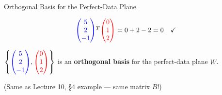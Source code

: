 \documentclass[10pt]{beamer}
\theoremstyle{definition}
\newcommand{\x}[1]{\alert{\textbf{#1}}}
\newcommand{\rd}[1]{{\color{red}#1}}                  %
\newcommand{\bl}[1]{{\color{blue}#1}}                 %
\begin{document}
\begin{frame}{Orthogonal Basis for the Perfect-Data Plane}

$$\bl{\begin{pmatrix} 5 \\ 2 \\ -1 \end{pmatrix}}^T \rd{\begin{pmatrix} 0 \\ 1 \\ 2 \end{pmatrix}} = 0 + 2 - 2 = 0 \quad \checkmark$$

\vspace{0.5em}

$\left\{\bl{\begin{pmatrix} 5 \\ 2 \\ -1 \end{pmatrix}}, \rd{\begin{pmatrix} 0 \\ 1 \\ 2 \end{pmatrix}}\right\}$ is an \x{orthogonal basis} for the perfect-data plane $W$.

\vspace{0.5em}

\small (Same as Lecture 10, \S4 example --- same matrix $B$!)

\end{frame}
\end{document}
